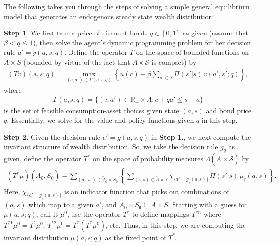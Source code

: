 
\par \noindent The following takes you through the steps of solving a simple general equilibrium model
that generates an endogenous steady state wealth distribution:\newline

\par\noindent \colorbox{black!12}{\textbf{Step 1.}}  We first take a price of discount bonds
$q \in [0,1]$ as given (assume that $\beta < q \leq 1$), then solve
the agent's dynamic programming problem for her decision rule $a'= g(a,s; q)$.
Define the operator $T$ on the space of bounded functions on $A \times S$
(bounded by virtue of the fact that $A \times \mathcal{S}$ is compact) by
\begin{eqnarray}
    (Tv)(a,s;q)
    = \max_{(c,a') \in \Gamma(a,s;q)} \left\{ u(c)
    + \beta \displaystyle{\sum_{s' \in \mathcal{S}} \Pi(s'|s)\, v(a',s';q)} \right\},
\end{eqnarray}
where
\begin{eqnarray}
    \Gamma(a,s;q) = \{ (c,a') \in \mathbb{R}_+ \times A : c + qa' \leq s + a \}
\end{eqnarray} is the set of feasible consumption-asset choices given state $(a,s)$ and bond price $q$.
Essentially, we solve for the value and policy functions given $q$ in this step.     \newline

\par\noindent \colorbox{black!12}{\textbf{Step 2.}} Given the decision rule $a' = g(a,s;q)$ in \textbf{Step 1.},
we next compute the invariant structure of wealth distribution. So, we take the decision rule $g_q$ as given,
define the operator $T^*$ on the space of probability measures $\Lambda(\tilde{A}\times \mathcal{S})$ by
\begin{eqnarray}
    (T^* \mu)(\tilde{A}_0, S_0)
    = \sum_{(a',s') \in \tilde{A}_0 \times S_0}
    \left\{ \sum_{(a,s) \in \tilde{A} \times \mathcal{S}}
    \chi_{\{a' = g_q(a,s)\}} \, \Pi(s'|s)\,\mu_q(a,s) \right\}.
\end{eqnarray}
\noindent
Here, $\chi_{\{a' = g_q(a,s)\}}$ is an indicator function that picks out combinations of $(a,s)$
which map to a given $a'$, and $\tilde{A}_0 \times S_0 \subseteq \tilde{A} \times S$.
Starting with a guess for $\mu(a,s;q)$, call it $\mu^0$, use the operator $T^*$
to define mappings $T^{*n}$ where $T^{*1}\mu^0 = T^*\mu^0$, $T^{*2}\mu^0 = T^*(T^*\mu^0)$, etc.
Thus, in this step, we are computing the invariant distribution $\mu(a,s;q)$ as the fixed point of $T^*$. \newline

